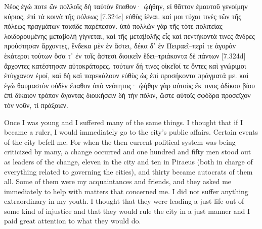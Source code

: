 \documentclass[12pt]{book}
\begin{document}
\begin{pairs}
\begin{Rightside}
\begin{Ancient Greek}
\beginnumbering
\pstart
Νέος ἐγώ ποτε ὢν πολλοῖς δὴ ταὐτὸν ἔπαθον· ᾠήθην, εἰ θᾶττον ἐμαυτοῦ γενοίμην κύριος, ἐπὶ τὰ κοινὰ τῆς πόλεως [7.324c] εὐθὺς ἰέναι. καί μοι τύχαι τινὲς τῶν τῆς πόλεως πραγμάτων τοιαίδε παρέπεσον. ὑπὸ πολλῶν γὰρ τῆς τότε πολιτείας λοιδορουμένης μεταβολὴ γίγνεται, καὶ τῆς μεταβολῆς εἷς καὶ πεντήκοντά τινες ἄνδρες προύστησαν ἄρχοντες, ἕνδεκα μὲν ἐν ἄστει, δέκα δ᾽ ἐν Πειραεῖ--περί τε ἀγορὰν ἑκάτεροι τούτων ὅσα τ᾽ ἐν τοῖς ἄστεσι διοικεῖν ἔδει--τριάκοντα δὲ πάντων [7.324d] ἄρχοντες κατέστησαν αὐτοκράτορες. τούτων δή τινες οἰκεῖοί τε ὄντες καὶ γνώριμοι ἐτύγχανον ἐμοί, καὶ δὴ καὶ παρεκάλουν εὐθὺς ὡς ἐπὶ προσήκοντα πράγματά με. καὶ ἐγὼ θαυμαστὸν οὐδὲν ἔπαθον ὑπὸ νεότητος· ᾠήθην γὰρ αὐτοὺς ἔκ τινος ἀδίκου βίου ἐπὶ δίκαιον τρόπον ἄγοντας διοικήσειν δὴ τὴν πόλιν, ὥστε αὐτοῖς σφόδρα προσεῖχον τὸν νοῦν, τί πράξοιεν.	
\pend
\endnumbering
\end{Ancient Greek}
\end{Rightside}
\begin{Leftside}
\begin{English}
\beginnumbering
\pstart
Once I was young and I suffered many of the same things. I thought that if I became a ruler, I would immediately go to the city's public affairs. Certain events of the city befell me. For when the then current political system was being criticized by many, a change occurred and one hundred and fifty men stood out as leaders of the change, eleven in the city and ten in Piraeus (both in charge of everything related to governing the cities), and thirty became autocrats of them all. Some of them were my acquaintances and friends, and they asked me immediately to help with matters that concerned me. I did not suffer anything extraordinary in my youth. I thought that they were leading a just life out of some kind of injustice and that they would rule the city in a just manner and I paid great attention to what they would do.
\pend
\endnumbering
\end{English}
\end{Leftside}
\end{pairs}
\Columns
\end{document}
